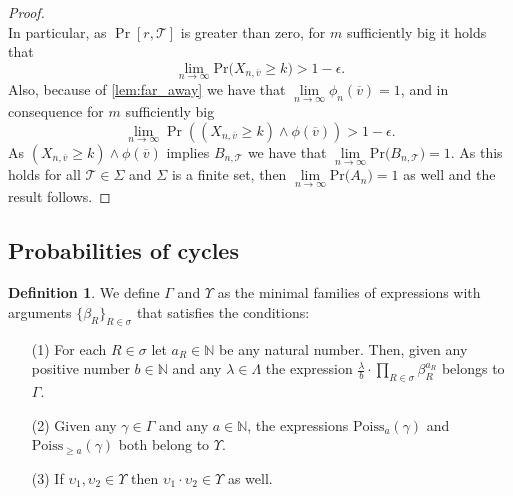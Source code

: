 \documentclass[12pt,notitlepage,a4paper]{article}
\theoremstyle{definition}
\newtheorem{definition}{Definition}[section]
\newcommand{\N}{\mathbb{N}}
\newcommand{\Ln}{\lim\limits_{n\to \infty}}
\newcommand{\PR}[1]{\mathrm{Pr}\big(#1\big)}
\begin{document}
\begin{proof}
\[		\]		    
		In particular, as $\Pr[r, \mathcal{T}]$ is greater than zero, for $m$ sufficiently
		big it holds that
		\[
		\Ln \PR{X_{n,\overline{v}}\geq k}> 1- \epsilon.
		\]
		Also, because of \cref{lem:far_away} we have that $\Ln \phi_n(\overline{v})=1$,
		and in consequence for $m$ sufficiently big
		\[
		\Ln \Pr\left(
		(X_{n,\overline{v}}\geq k)
		\wedge \phi(\overline{v})
		\right)> 1- \epsilon.
		\]
		As $(X_{n,\overline{v}}\geq k)
		\wedge \phi(\overline{v})$ implies $B_{n,\mathcal{T}}$ we have that
		$\Ln \PR{B_{n,\mathcal{T}}}=1$. As this holds for all $\mathcal{T}\in \Sigma$
		and $\Sigma$ is a finite set, then $\Ln \PR{A_n}=1$ as well and the result follows. 
	\end{proof}
		
	\subsection{Probabilities of cycles}
	
\begin{definition}
	We define $\Gamma$ and $\Upsilon$ as the minimal families of expressions with arguments
	$\{\beta_R\}_{R\in \sigma}$ that satisfies the conditions:
	\begin{itemize}
	\item[(1)] For each $R\in \sigma$ let $a_R\in \N$ be any natural number. Then, given any positive number $b\in \N$
	and any $\lambda\in \Lambda$ the expression $\frac{\lambda}{b}\cdot \prod_{R\in \sigma} \beta_R^{a_R}$
	belongs to $\Gamma$.
	\item[(2)] Given any $\gamma\in \Gamma$ and any $a\in \N$, the expressions $\mathrm{Poiss}_a(\gamma)$
	and $\mathrm{Poiss}_{\geq a}(\gamma)$ both belong to $\Upsilon$.
	\item[(3)] If $\upsilon_1, \upsilon_2\in \Upsilon$ then 
	$\upsilon_1\cdot \upsilon_2 \in \Upsilon$ as well. 
	\end{itemize}
\end{definition}
\end{document}
